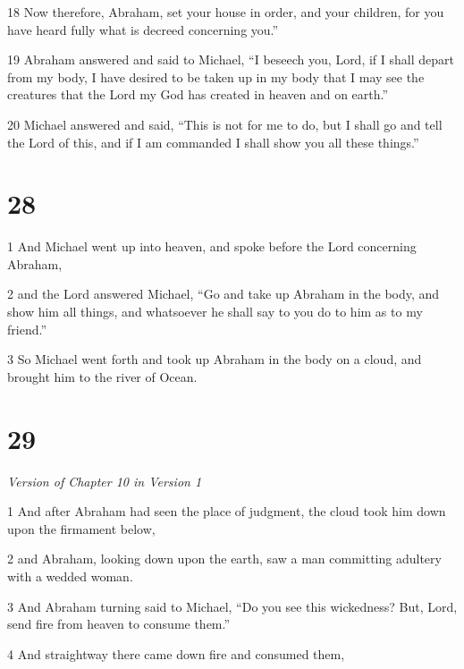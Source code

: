 \par 18 Now therefore, Abraham, set your house in order, and your children, for you have heard fully what is decreed concerning you.” 

\par 19 Abraham answered and said to Michael, “I beseech you, Lord, if I shall depart from my body, I have desired to be taken up in my body that I may see the creatures that the Lord my God has created in heaven and on earth.” 

\par 20 Michael answered and said, “This is not for me to do, but I shall go and tell the Lord of this, and if I am commanded I shall show you all these things.”

\chapter{28}

\par 1 And Michael went up into heaven, and spoke before the Lord concerning Abraham, 

\par 2 and the Lord answered Michael, “Go and take up Abraham in the body, and show him all things, and whatsoever he shall say to you do to him as to my friend.” 

\par 3 So Michael went forth and took up Abraham in the body on a cloud, and brought him to the river of Ocean.

\chapter{29}

\par \textit{Version of Chapter 10 in Version 1}

\par 1 And after Abraham had seen the place of judgment, the cloud took him down upon the firmament below, 

\par 2 and Abraham, looking down upon the earth, saw a man committing adultery with a wedded woman. 

\par 3 And Abraham turning said to Michael, “Do you see this wickedness? But, Lord, send fire from heaven to consume them.” 

\par 4 And straightway there came down fire and consumed them, 


